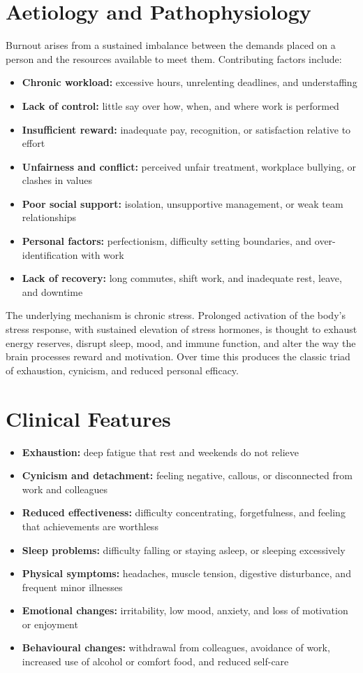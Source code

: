 \section*{Aetiology and Pathophysiology}
Burnout arises from a sustained imbalance between the demands placed on a person and the resources available to meet them. Contributing factors include:
\begin{itemize}
    \item \textbf{Chronic workload:} excessive hours, unrelenting deadlines, and understaffing
    \item \textbf{Lack of control:} little say over how, when, and where work is performed
    \item \textbf{Insufficient reward:} inadequate pay, recognition, or satisfaction relative to effort
    \item \textbf{Unfairness and conflict:} perceived unfair treatment, workplace bullying, or clashes in values
    \item \textbf{Poor social support:} isolation, unsupportive management, or weak team relationships
    \item \textbf{Personal factors:} perfectionism, difficulty setting boundaries, and over-identification with work
    \item \textbf{Lack of recovery:} long commutes, shift work, and inadequate rest, leave, and downtime
\end{itemize}

The underlying mechanism is chronic stress. Prolonged activation of the body's stress response, with sustained elevation of stress hormones, is thought to exhaust energy reserves, disrupt sleep, mood, and immune function, and alter the way the brain processes reward and motivation. Over time this produces the classic triad of exhaustion, cynicism, and reduced personal efficacy.

\section*{Clinical Features}
\begin{itemize}
    \item \textbf{Exhaustion:} deep fatigue that rest and weekends do not relieve
    \item \textbf{Cynicism and detachment:} feeling negative, callous, or disconnected from work and colleagues
    \item \textbf{Reduced effectiveness:} difficulty concentrating, forgetfulness, and feeling that achievements are worthless
    \item \textbf{Sleep problems:} difficulty falling or staying asleep, or sleeping excessively
    \item \textbf{Physical symptoms:} headaches, muscle tension, digestive disturbance, and frequent minor illnesses
    \item \textbf{Emotional changes:} irritability, low mood, anxiety, and loss of motivation or enjoyment
    \item \textbf{Behavioural changes:} withdrawal from colleagues, avoidance of work, increased use of alcohol or comfort food, and reduced self-care
\end{itemize}

